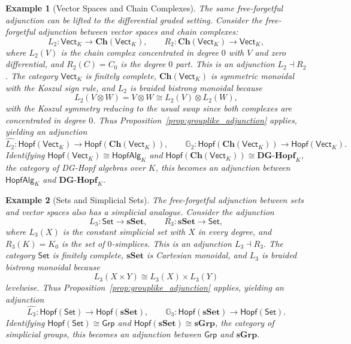 \documentclass{amsart}
\newcommand{\Set}{\mathsf{Set}}
\newcommand{\Vect}{\mathsf{Vect}}
\newcommand{\Grp}{\mathsf{Grp}}
\newcommand{\HopfAlg}{\mathsf{HopfAlg}}
\newcommand{\VectK}{\Vect_K}
\newtheorem{example}{Example}[section]
\begin{document}
\begin{example}[Vector Spaces and Chain Complexes]\label{ex:vect_ch}
The same free-forgetful adjunction can be lifted to the differential graded setting. Consider the free-forgetful adjunction between vector spaces and chain complexes:
\[
L_2:\VectK\longrightarrow \mathbf{Ch}(\VectK),\qquad
R_2:\mathbf{Ch}(\VectK)\longrightarrow\VectK,
\]
where $L_2(V)$ is the chain complex concentrated in degree $0$ with $V$ and zero differential, and $R_2(C)=C_0$ is the degree $0$ part. This is an adjunction $L_2\dashv R_2$. The category $\VectK$ is finitely complete, $\mathbf{Ch}(\VectK)$ is symmetric monoidal with the Koszul sign rule, and $L_2$ is braided bistrong monoidal because
\[
L_2(V\otimes W)=V\otimes W\cong L_2(V)\otimes L_2(W),
\]
with the Koszul symmetry reducing to the usual swap since both complexes are concentrated in degree $0$. Thus Proposition~\ref{prop:grouplike_adjunction} applies, yielding an adjunction
\[
\widehat{L_2}:\mathsf{Hopf}(\VectK)\longrightarrow \mathsf{Hopf}(\mathbf{Ch}(\VectK)),\qquad
\mathbb{G}_2:\mathsf{Hopf}(\mathbf{Ch}(\VectK))\longrightarrow \mathsf{Hopf}(\VectK).
\]
Identifying $\mathsf{Hopf}(\VectK)\cong\HopfAlg_K$ and $\mathsf{Hopf}(\mathbf{Ch}(\VectK))\cong \mathbf{DG\text{-}Hopf}_K$, the category of DG-Hopf algebras over $K$, this becomes an adjunction between $\HopfAlg_K$ and $\mathbf{DG\text{-}Hopf}_K$.
\end{example}

\begin{example}[Sets and Simplicial Sets]\label{ex:set_sset}
The free-forgetful adjunction between sets and vector spaces also has a simplicial analogue. Consider the adjunction
\[
L_3:\Set\longrightarrow\mathbf{sSet},\qquad
R_3:\mathbf{sSet}\longrightarrow\Set,
\]
where $L_3(X)$ is the constant simplicial set with $X$ in every degree, and $R_3(K)=K_0$ is the set of $0$-simplices. This is an adjunction $L_3\dashv R_3$. The category $\Set$ is finitely complete, $\mathbf{sSet}$ is Cartesian monoidal, and $L_3$ is braided bistrong monoidal because
\[
L_3(X\times Y)\cong L_3(X)\times L_3(Y)
\]
levelwise. Thus Proposition~\ref{prop:grouplike_adjunction} applies, yielding an adjunction
\[
\widehat{L_3}:\mathsf{Hopf}(\Set)\longrightarrow \mathsf{Hopf}(\mathbf{sSet}),\qquad
\mathbb{G}_3:\mathsf{Hopf}(\mathbf{sSet})\longrightarrow \mathsf{Hopf}(\Set).
\]
Identifying $\mathsf{Hopf}(\Set)\cong\Grp$ and $\mathsf{Hopf}(\mathbf{sSet})\cong\mathbf{sGrp}$, the category of simplicial groups, this becomes an adjunction between $\Grp$ and $\mathbf{sGrp}$.
\end{example}
\end{document}
